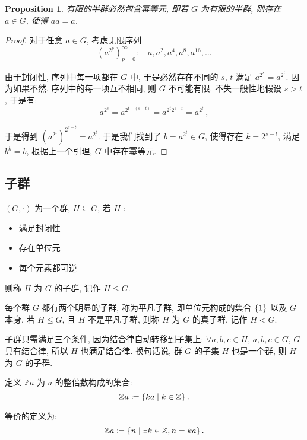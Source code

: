 \documentclass[UTF8]{ctexart}
\theoremstyle{mystyle}
\newtheorem{proposition}{Proposition}[section]
\theoremstyle{myremark}
\theoremstyle{plain}
\newcommand{\Z}{\mathbb Z}
\DeclarePairedDelimiter\set{\{}{\}}
\begin{document}
\begin{proposition}
    有限的半群必然包含幂等元, 即若 $ G $ 为有限的半群, 则存在 $ a \in G $, 使得 $ aa = a $.
\end{proposition}

\begin{proof}
    对于任意 $ a \in G $, 考虑无限序列 \[ \left( a^{2^p} \right)_{p = 0}^\infty \colon \quad a, a^2, a^4, a^8, a^{16}, \dots \]

    由于封闭性, 序列中每一项都在 $ G $ 中, 于是必然存在不同的 $ s $, $ t $ 满足 $ a^{\displaystyle 2^s} = a^{\displaystyle 2^t} $. 因为如果不然, 序列中的每一项互不相同, 则 $ G $ 不可能有限. 不失一般性地假设 $ s > t $, 于是有: \[ a^{\displaystyle 2^{s}} = a^{\displaystyle 2^{t + (s - t)}} = a^{\displaystyle 2^{t} 2^{\displaystyle s - t}} = a^{\displaystyle 2^t} \,,\]

    于是得到 $ \left( a^{\displaystyle 2^t} \right)^{\displaystyle 2^{s - t}} = a^{\displaystyle 2^t} $. 于是我们找到了 $ b = a^{\displaystyle 2^t} \in G $, 使得存在 $ k = 2^{s - t} $, 满足 $ b^k = b $, 根据上一个引理, $ G $ 中存在幂等元.
\end{proof}


\subsection{子群}
\begin{definition}[\text{子群}]
    $ (G, \cdot) $ 为一个群, $ H \subseteq G $, 若 $ H $ :
    \begin{itemize}
        \item 满足封闭性
        \item 存在单位元
        \item 每个元素都可逆
    \end{itemize}
    则称 $ H $ 为 $ G $ 的子群, 记作 $ H \le G $.

    每个群 $ G $ 都有两个明显的子群, 称为平凡子群, 即单位元构成的集合 $ \set{1} $ 以及 $ G $ 本身. 若 $ H \le G $, 且 $ H $ 不是平凡子群, 则称 $ H $ 为 $ G $ 的真子群, 记作 $ H < G $.
\end{definition}

子群只需满足三个条件, 因为结合律自动转移到子集上: $ \forall a, b, c \in H $, $ a, b, c \in G $, $ G $ 具有结合律, 所以 $ H $ 也满足结合律. 换句话说, 群 $ G $ 的子集 $ H $ 也是一个群, 则 $ H $ 为 $ G $ 的子群.


定义 $ \Z a $ 为 $ a $ 的整倍数构成的集合:
\[ \Z a \coloneqq \set{k a \mid k \in \Z} \,.\]

等价的定义为:
\[ \Z a \coloneqq \set{n \mid \exists k \in \Z, n = k a} \,.\]
\end{document}
